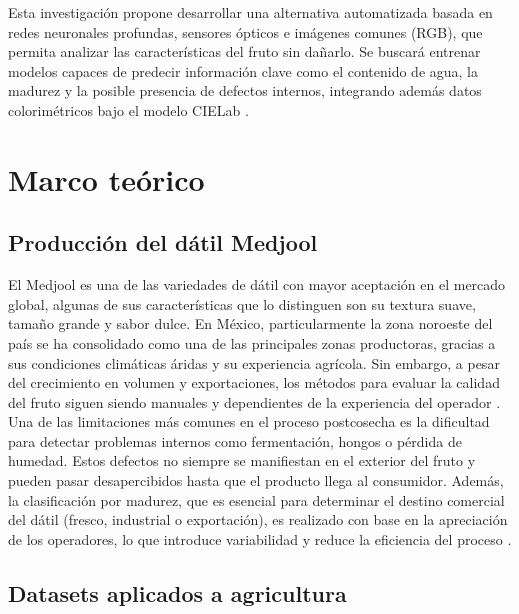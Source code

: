 Esta investigación propone desarrollar una alternativa automatizada basada en redes neuronales profundas, sensores ópticos e imágenes comunes (RGB), que permita analizar las características del fruto sin dañarlo. Se buscará entrenar modelos capaces de predecir información clave como el contenido de agua, la madurez y la posible presencia de defectos internos, integrando además datos colorimétricos bajo el modelo CIELab \parencite{habib_external_2022}.


\section{Marco teórico}

\subsection{Producción del dátil Medjool}

El Medjool es una de las variedades de dátil con mayor aceptación en el mercado global, algunas de sus características que lo distinguen son su textura suave, tamaño grande y sabor dulce. En México, particularmente la zona noroeste del país se ha consolidado como una de las principales zonas productoras, gracias a sus condiciones climáticas áridas y su experiencia agrícola. Sin embargo, a pesar del crecimiento en volumen y exportaciones, los métodos para evaluar la calidad del fruto siguen siendo manuales y dependientes de la experiencia del operador \parencite{salomon-torres_produccion_2017}.\\

Una de las limitaciones más comunes en el proceso postcosecha es la dificultad para detectar problemas internos como fermentación, hongos o pérdida de humedad. Estos defectos no siempre se manifiestan en el exterior del fruto y pueden pasar desapercibidos hasta que el producto llega al consumidor. Además, la clasificación por madurez, que es esencial para determinar el destino comercial del dátil (fresco, industrial o exportación), es realizado con base en la apreciación de los operadores, lo que introduce variabilidad y reduce la eficiencia del proceso \parencite{perez-perez_evaluation_2021}.

\subsection{Datasets aplicados a agricultura}

